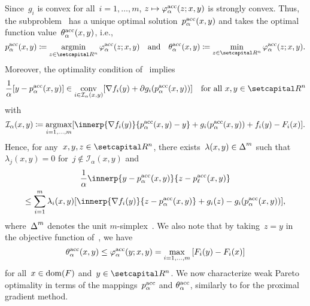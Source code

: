 \documentclass[../main]{subfiles}
\begin{document}
Since~$g_i$ is convex for all~$i = 1, \dots, m$, $z \mapsto \varphi^{\mathrm{acc}}_\alpha(z; x, y)$ is strongly convex.
Thus, the subproblem~ has a unique optimal solution~$p^{\mathrm{acc}}_\alpha(x, y)$ and takes the optimal function value~$\theta^{\mathrm{acc}}_\alpha(x, y)$, i.e.,
\begin{equation} \label{eq:acc_pgm_optimal_function}
    p^\acc_\alpha(x, y) \coloneqq \argmin_{z \in \setR^n} \varphi^\acc_\alpha(z; x, y) \eqand \theta^\acc_\alpha(x, y) \coloneqq \min_{z \in \setR^n} \varphi^\acc_\alpha(z; x, y)
    .\end{equation}
Moreover, the optimality condition of~ implies
\begin{equation}
    \frac{1}{\alpha} [ y - p^\acc_\alpha(x, y) ] \in \conv_{i \in \mathcal{I}_\alpha(x, y)} [ \nabla f_i(y) + \partial g_i(p^\acc_\alpha(x, y)) ] \forallcondition{x, y \in \setR^n}
\end{equation}
with
\begin{equation} \label{eq:acc_pgm_active}
    \mathcal{I}_\alpha(x, y) \coloneqq \argmax_{i = 1, \dots, m} [ \innerp{\nabla f_i(y)}{p^\acc_\alpha(x, y) - y} + g_i(p^\acc_\alpha(x, y)) + f_i(y) - F_i(x) ]
    .\end{equation}
Hence, for any~$x, y, z \in \setR^n$, there exists~$\lambda(x, y) \in \operatorname{\Delta}^m$ such that~$\lambda_j(x, y) = 0$ for~$j \notin \mathcal{I}_\alpha(x, y)$ and
\begin{multline} \label{eq:acc_pgm_opt}
    \frac{1}{\alpha} \innerp{y - p^\acc_\alpha(x, y)}{z - p^\acc_\ell(x, y)} \\
    \le \sum_{i = 1}^{m} \lambda_i(x, y) [\innerp{\nabla f_i(y)}{z - p^\acc_\alpha(x, y)} + g_i(z) - g_i(p^\acc_\alpha(x, y))]
    ,\end{multline}
where~$\operatorname{\Delta}^m$ denotes the unit $m$-simplex~.
We also note that by taking~$z = y$ in the objective function of~, we have
\begin{equation} \label{eq:acc_pgm_opt_triv}
    \theta^{\mathrm{acc}}_\alpha(x, y) \le \varphi^{\mathrm{acc}}_\alpha(y; x, y) = \max_{i = 1, \dots, m}\left[ F_i(y) - F_i(x) \right]
\end{equation}
for all~$x \in \operatorname{dom}(F)$ and~$y \in \setR^n$.
We now characterize weak Pareto optimality in terms of the mappings~$p^{\mathrm{acc}}_\alpha$ and $\theta^{\mathrm{acc}}_\alpha$, similarly to  for the proximal gradient method.
\end{document}
